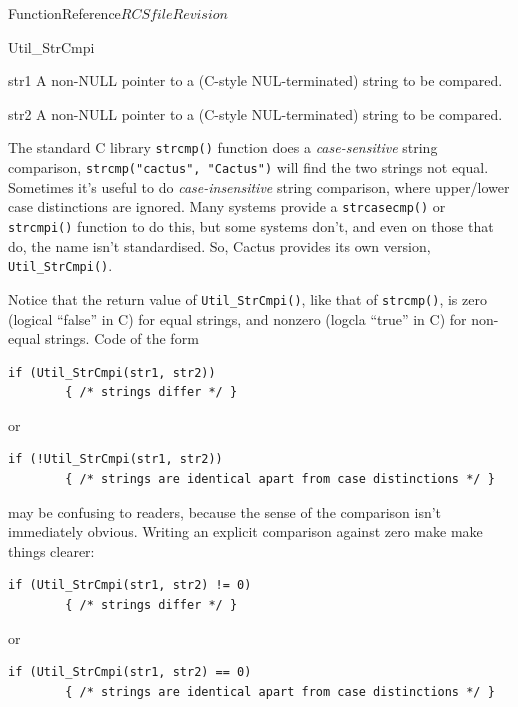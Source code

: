 \begin{cactuspart}{FunctionReference}{$RCSfile$}{$Revision$}
\begin{FunctionDescription}{Util\_StrCmpi}
\begin{ParameterSection}
\begin{Parameter}{str1}
A non-NULL pointer to a (C-style NUL-terminated) string to be compared.
\end{Parameter}
\begin{Parameter}{str2}
A non-NULL pointer to a (C-style NUL-terminated) string to be compared.
\end{Parameter}
\end{ParameterSection}

\begin{Discussion}
The standard C library \verb|strcmp()| function does a {\em case-sensitive\/}
string comparison, \ie{} \verb|strcmp("cactus", "Cactus")| will find the
two strings not equal.  Sometimes it's useful to do {\em case-insensitive\/}
string comparison, where upper/lower case distinctions are ignored.
Many systems provide a \verb|strcasecmp()| or \verb|strcmpi()|
function to do this, but some systems don't, and even on those that do,
the name isn't standardised.  So, Cactus provides its own version,
\verb|Util_StrCmpi()|.

Notice that the return value of \verb|Util_StrCmpi()|, like that of
\verb|strcmp()|, is zero (logical ``false'' in C) for equal strings,
and nonzero (logcla ``true'' in C) for non-equal strings.
Code of the form
\begin{verbatim}
if (Util_StrCmpi(str1, str2))
        { /* strings differ */ }
\end{verbatim}
or
\begin{verbatim}
if (!Util_StrCmpi(str1, str2))
        { /* strings are identical apart from case distinctions */ }
\end{verbatim}
may be confusing to readers, because the sense of the comparison
isn't immediately obvious.  Writing an explicit comparison against zero
make make things clearer:
\begin{verbatim}
if (Util_StrCmpi(str1, str2) != 0)
        { /* strings differ */ }
\end{verbatim}
or
\begin{verbatim}
if (Util_StrCmpi(str1, str2) == 0)
        { /* strings are identical apart from case distinctions */ }
\end{verbatim}


\end{Discussion}
\end{FunctionDescription}
\end{cactuspart}
